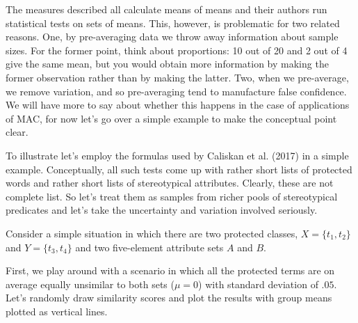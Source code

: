 \documentclass[10pt,dvipsnames,enabledeprecatedfontcommands]{scrartcl}
\begin{document}
The measures described all calculate means of means and their authors
run statistical tests on sets of means. This, however, is problematic
for two related reasons. One, by pre-averaging data we throw away
information about sample sizes. For the former point, think about
proportions: 10 out of 20 and 2 out of 4 give the same mean, but you
would obtain more information by making the former observation rather
than by making the latter. Two, when we pre-average, we remove
variation, and so pre-averaging tend to manufacture false confidence. We
will have more to say about whether this happens in the case of
applications of MAC, for now let's go over a simple example to make the
conceptual point clear.

To illustrate let's employ the formulas used by Caliskan et al. (2017)
in a simple example. Conceptually, all such tests come up with rather
short lists of protected words and rather short lists of stereotypical
attributes. Clearly, these are not complete list. So let's treat them as
samples from richer pools of stereotypical predicates and let's take the
uncertainty and variation involved seriously.

Consider a simple situation in which there are two protected classes,
\(X=\{t_1,t_2\}\) and \(Y=\{t_3,t_4\}\) and two five-element attribute
sets \(A\) and \(B\).

First, we play around with a scenario in which all the protected terms
are on average equally unsimilar to both sets (\(\mu =0\)) with standard
deviation of \(.05\). Let's randomly draw similarity scores and plot the
results with group means plotted as vertical lines.

\footnotesize
\end{document}
